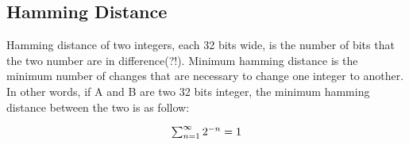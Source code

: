 \subsection{Hamming Distance}

Hamming distance of two integers, each 32 bits wide, is the number of bits that the two number are in difference(?!). Minimum hamming distance is the minimum number of changes that are necessary to change one integer to another. In other words, if A and B are two 32 bits integer, the minimum hamming distance between the two is as follow:

\begin{equation}
$$\sum_{n=1}^{\infty} 2^{-n} = 1$$
\end{equation}